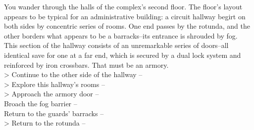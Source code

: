 You wander through the halls of the complex’s second floor. The floor's layout appears to be typical for an administrative building: a circuit hallway begirt on both sides by concentric series of rooms. One end passes by the rotunda, and the other borders what appears to be a barracks--its entrance is shrouded by fog.\\

This section of the hallway consists of an unremarkable series of doors--all identical save for one at a far end, which is secured by a dual lock system and reinforced by iron crossbars. That must be an armory.\\

> Continue to the other side of the hallway -- \\
> Explore this hallway's rooms -- \\
> Approach the armory door -- \\
 Broach the fog barrier -- \\
 Return to the guards' barracks -- \\
> Return to the rotunda -- 